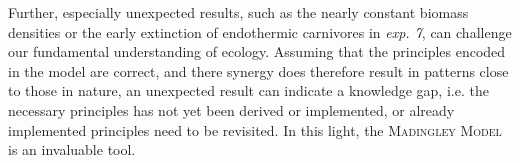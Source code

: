 Further, especially unexpected results, such as the nearly constant biomass densities or the early extinction of endothermic carnivores in \textit{exp. 7}, can challenge our fundamental understanding of ecology. Assuming that the principles encoded in the model are correct, and there synergy does therefore result in patterns close to those in nature, an unexpected result can indicate a knowledge gap, i.e. the necessary principles has not yet been derived or implemented, or already implemented principles need to be revisited. In this light, the \textsc{Madingley Model} is an invaluable tool.